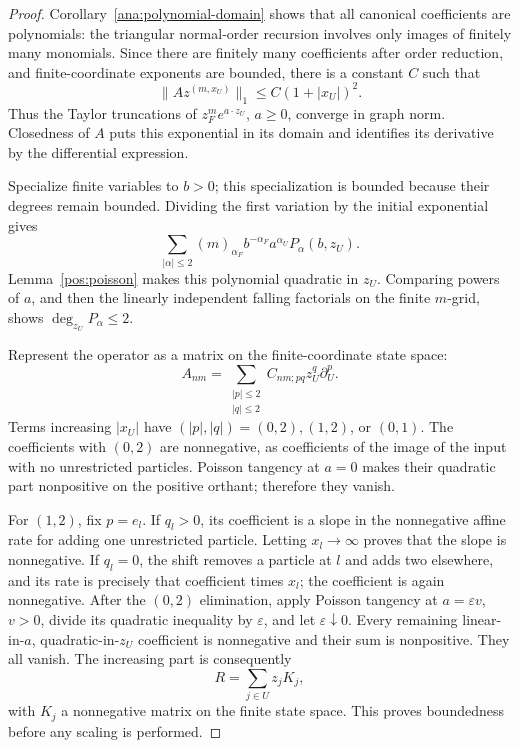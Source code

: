 \documentclass[reqno]{amsart}
\theoremstyle{definition}
\theoremstyle{remark}
\begin{document}
\begin{proof}
Corollary~\ref{ana:polynomial-domain} shows that all canonical coefficients
are polynomials: the triangular normal-order recursion involves only
images of finitely many monomials.  Since there are finitely many
coefficients after order reduction, and finite-coordinate exponents are
bounded, there is a constant \(C\) such that
\[
 \|Az^{(m,x_U)}\|_1\le C(1+|x_U|)^2.
\]
Thus the Taylor truncations of \(z_F^m e^{a\cdot z_U}\), \(a\ge0\),
converge in graph norm.  Closedness of \(A\) puts this exponential in its
domain and identifies its derivative by the differential expression.

Specialize finite variables to \(b>0\); this specialization is bounded
because their degrees remain bounded.  Dividing the first variation by
the initial exponential gives
\[
 \sum_{|\alpha|\le2}(m)_{\alpha_F}b^{-\alpha_F}
       a^{\alpha_U}P_\alpha(b,z_U).
\]
Lemma~\ref{pos:poisson} makes this polynomial quadratic in
\(z_U\).  Comparing powers of \(a\), and then the linearly independent
falling factorials on the finite \(m\)-grid, shows
\(\deg_{z_U}P_\alpha\le2\).

Represent the operator as a matrix on the finite-coordinate state space:
\[
 A_{nm}=\sum_{\substack{|p|\le2\\|q|\le2}}
              C_{nm;pq}z_U^q\partial_U^p .
\]
Terms increasing \(|x_U|\) have \((|p|,|q|)=(0,2),(1,2)\), or \((0,1)\).
The coefficients with \((0,2)\) are nonnegative, as coefficients of the
image of the input with no unrestricted particles.  Poisson tangency at
\(a=0\) makes their quadratic part nonpositive on the positive orthant;
therefore they vanish.

For \((1,2)\), fix \(p=e_l\).  If \(q_l>0\), its coefficient is a slope in
the nonnegative affine rate for adding one unrestricted particle.
Letting \(x_l\to\infty\) proves that the slope is nonnegative.  If \(q_l=0\),
the shift removes a particle at \(l\) and adds two elsewhere, and its rate
is precisely that coefficient times \(x_l\); the coefficient is again
nonnegative.  After the \((0,2)\) elimination, apply Poisson tangency at
\(a=\varepsilon v\), \(v>0\), divide its quadratic inequality by
\(\varepsilon\), and let \(\varepsilon\downarrow0\).  Every remaining
linear-in-\(a\), quadratic-in-\(z_U\) coefficient is nonnegative and their
sum is nonpositive.  They all vanish.  The increasing part is consequently
\[
 R=\sum_{j\in U}z_jK_j,
\]
with \(K_j\) a nonnegative matrix on the finite state space.  This proves
boundedness before any scaling is performed.


\end{proof}
\end{document}
